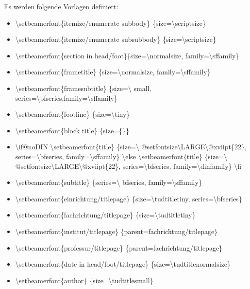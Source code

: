 \documentclass[presentation,t]{beamer}
\begin{document}
Es werden folgende Vorlagen definiert:
\begin{itemize}
\item \textbackslash setbeamerfont\{itemize/enumerate subbody\} \{size=\textbackslash scriptsize\}
\item \textbackslash setbeamerfont\{itemize/enumerate subsubbody\} \{size=\textbackslash scriptsize\}
\item \textbackslash setbeamerfont\{section in head/foot\}\{size=\textbackslash normalsize, family=\textbackslash sffamily\}
\item \textbackslash setbeamerfont\{frametitle\} \{size=\textbackslash normalsize, family=\textbackslash sffamily\}
\item \textbackslash setbeamerfont\{framesubtitle\} \{size=\textbackslash
   small, series=\textbackslash bfseries,family=\textbackslash sffamily\}
\item \textbackslash setbeamerfont\{footline\} \{size=\textbackslash tiny\}
\item \textbackslash setbeamerfont\{block title\} \{size=\{\}\}
\item \textbackslash if@noDIN
    \textbackslash setbeamerfont\{title\} \{size=\textbackslash
   @setfontsize\textbackslash LARGE\textbackslash @xviipt\{22\},
   series=\textbackslash bfseries, family=\textbackslash sffamily\}
  \textbackslash else
    \textbackslash setbeamerfont\{title\} \{size=\textbackslash
   @setfontsize\textbackslash LARGE\textbackslash @xviipt\{22\},
   series=\textbackslash bfseries, family=\textbackslash dinfamily\}
  \textbackslash fi
\item \textbackslash setbeamerfont\{subtitle\} \{series=\textbackslash
   bfseries, family=\textbackslash sffamily\}
\item \textbackslash setbeamerfont\{einrichtung/titlepage\}
   \{size=\textbackslash tudtitletiny, series=\textbackslash bfseries\}
\item \textbackslash setbeamerfont\{fachrichtung/titlepage\} \{size=\textbackslash tudtitletiny\}
\item \textbackslash setbeamerfont\{institut/titlepage\} \{parent=fachrichtung/titlepage\}
\item \textbackslash setbeamerfont\{professur/titlepage\} \{parent=fachrichtung/titlepage\}
\item \textbackslash setbeamerfont\{date in head/foot/titlepage\} \{size=\textbackslash tudtitlenormalsize\}
\item \textbackslash setbeamerfont\{author\} \{size=\textbackslash tudtitlesmall\}
\end{itemize}
\end{document}
